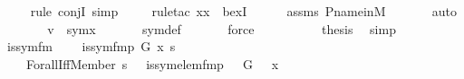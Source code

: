 \begin{isabellebody}
\ \ \ \ \isamarkupfalse%
{\isacharparenleft}{\kern0pt}rule\ conjI{\isacharcomma}{\kern0pt}\ simp{\isacharparenright}{\kern0pt}\isanewline
\ \ \ \ \isamarkupfalse%
{\isacharparenleft}{\kern0pt}rule{\isacharunderscore}{\kern0pt}tac\ x{\isacharequal}{\kern0pt}x\ \ bexI{\isacharparenright}{\kern0pt}\isanewline
\ \ \ \ \isamarkupfalse%
\ assms\ P{\isacharunderscore}{\kern0pt}name{\isacharunderscore}{\kern0pt}in{\isacharunderscore}{\kern0pt}M\ \isanewline
\ \ \ \ \isamarkupfalse%
\ auto\isanewline
\ \ \isamarkupfalse%
\ \isamarkupfalse%
\ {\isachardoublequoteopen}{\isachardot}{\kern0pt}{\isachardot}{\kern0pt}{\isachardot}{\kern0pt}\ {\isasymlongleftrightarrow}\ v\ {\isasymin}\ sym{\isacharparenleft}{\kern0pt}x{\isacharparenright}{\kern0pt}{\isachardoublequoteclose}\ \isanewline
\ \ \ \ \isamarkupfalse%
\ sym{\isacharunderscore}{\kern0pt}def\ \isanewline
\ \ \ \ \isamarkupfalse%
\ force\isanewline
\ \ \ \ \isamarkupfalse%
\isanewline
\ \ \isamarkupfalse%
\ \isamarkupfalse%
\ {\isacharquery}{\kern0pt}thesis\ \isamarkupfalse%
\ simp\isanewline
{}\isamarkupfalse%
%
\endisatagproof
{\isafoldproof}%
%
\isadelimproof
\isanewline
%
\endisadelimproof
{}\isamarkupfalse%
\isanewline
\isanewline
{}\isamarkupfalse%
\ is{\isacharunderscore}{\kern0pt}sym{\isacharunderscore}{\kern0pt}fm\ \ \isanewline
\ \ {\isachardoublequoteopen}is{\isacharunderscore}{\kern0pt}sym{\isacharunderscore}{\kern0pt}fm{\isacharparenleft}{\kern0pt}p{\isacharcomma}{\kern0pt}\ G{\isacharcomma}{\kern0pt}\ x{\isacharcomma}{\kern0pt}\ s{\isacharparenright}{\kern0pt}\ {\isasymequiv}\ \isanewline
\ \ \ \ Forall{\isacharparenleft}{\kern0pt}Iff{\isacharparenleft}{\kern0pt}Member{\isacharparenleft}{\kern0pt}{}{\isacharcomma}{\kern0pt}\ s\ {\isacharhash}{\kern0pt}{\isacharplus}{\kern0pt}\ {}{\isacharparenright}{\kern0pt}{\isacharcomma}{\kern0pt}\ is{\isacharunderscore}{\kern0pt}sym{\isacharunderscore}{\kern0pt}elem{\isacharunderscore}{\kern0pt}fm{\isacharparenleft}{\kern0pt}p\ {\isacharhash}{\kern0pt}{\isacharplus}{\kern0pt}\ {}{\isacharcomma}{\kern0pt}\ G\ {\isacharhash}{\kern0pt}{\isacharplus}{\kern0pt}\ {}{\isacharcomma}{\kern0pt}\ x\ {\isacharhash}{\kern0pt}{\isacharplus}{\kern0pt}\ {}{\isacharcomma}{\kern0pt}\ {}{\isacharparenright}{\kern0pt}{\isacharparenright}{\kern0pt}{\isacharparenright}{\kern0pt}{\isachardoublequoteclose}\ \isanewline

\end{isabellebody}
